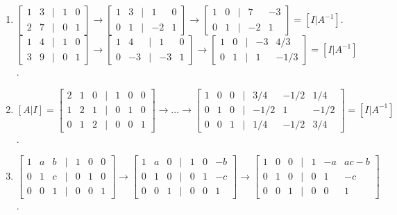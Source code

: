 \documentclass[12pt,a4paper]{article}
\begin{document}
{\begin{enumerate}
			\item $\begin{bmatrix} 1 & 3 & | & 1 & 0 \\ 2 & 7 & | & 0 & 1 \end{bmatrix} \to \begin{bmatrix} 1 & 3 & | & 1 & 0 \\ 0 & 1 & | & -2 & 1 \end{bmatrix} \to \begin{bmatrix} 1 & 0 & | & 7 & -3 \\ 0 & 1 & | & -2 & 1 \end{bmatrix} = [I | A^{-1}]$.
			$\begin{bmatrix} 1 & 4 & | & 1 & 0 \\ 3 & 9 & | & 0 & 1 \end{bmatrix} \to \begin{bmatrix} 1 & 4 & | & 1 & 0 \\ 0 & -3 & | & -3 & 1 \end{bmatrix} \to \begin{bmatrix} 1 & 0 & | & -3 & 4/3 \\ 0 & 1 & | & 1 & -1/3 \end{bmatrix} = [I | A^{-1}]$.
			
			\item $[A|I] = \begin{bmatrix} 2 & 1 & 0 & | & 1 & 0 & 0 \\ 1 & 2 & 1 & | & 0 & 1 & 0 \\ 0 & 1 & 2 & | & 0 & 0 & 1 \end{bmatrix} \to \dots \to \begin{bmatrix} 1 & 0 & 0 & | & 3/4 & -1/2 & 1/4 \\ 0 & 1 & 0 & | & -1/2 & 1 & -1/2 \\ 0 & 0 & 1 & | & 1/4 & -1/2 & 3/4 \end{bmatrix} = [I | A^{-1}]$.
			
			\item $\begin{bmatrix} 1 & a & b & | & 1 & 0 & 0 \\ 0 & 1 & c & | & 0 & 1 & 0 \\ 0 & 0 & 1 & | & 0 & 0 & 1 \end{bmatrix} \to \begin{bmatrix} 1 & a & 0 & | & 1 & 0 & -b \\ 0 & 1 & 0 & | & 0 & 1 & -c \\ 0 & 0 & 1 & | & 0 & 0 & 1 \end{bmatrix} \to \begin{bmatrix} 1 & 0 & 0 & | & 1 & -a & ac-b \\ 0 & 1 & 0 & | & 0 & 1 & -c \\ 0 & 0 & 1 & | & 0 & 0 & 1 \end{bmatrix}$.
			

\end{enumerate}}
\end{document}
